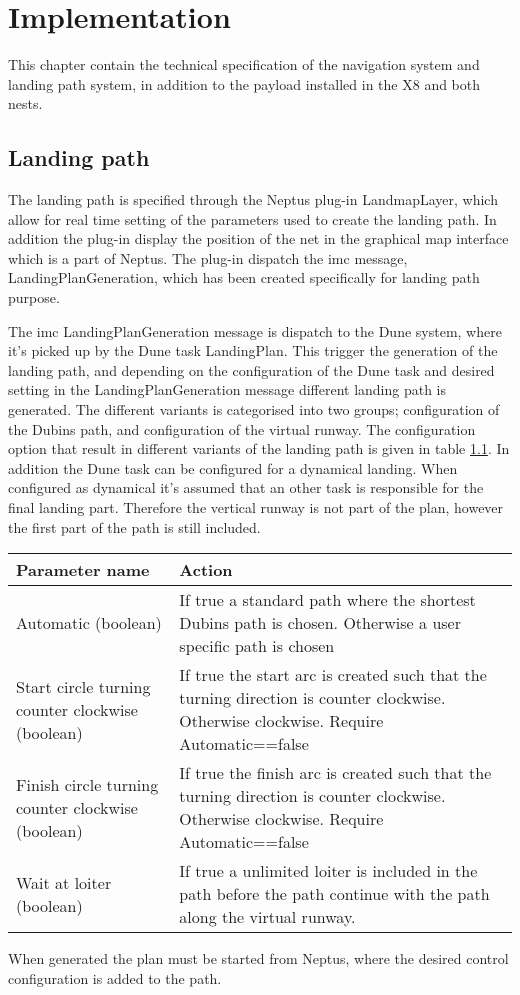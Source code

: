 \chapter{Implementation}
This chapter contain the technical specification of the navigation system and landing path system, in addition to the payload installed in the X8 and both nests.
\section{Landing path}
The landing path is specified through the Neptus plug-in LandmapLayer, which allow for real time setting of the parameters used to create the landing path. In addition the plug-in display the position of the net in the graphical map interface which is a part of Neptus. The plug-in dispatch the \gls{imc} message, LandingPlanGeneration, which has been created specifically for landing path purpose.

The \gls{imc} LandingPlanGeneration message is dispatch to the Dune system, where it's picked up by the Dune task LandingPlan. This trigger the generation of the landing path, and depending on the configuration of the Dune task and desired setting in the LandingPlanGeneration message different landing path is generated. The different variants is categorised into two groups; configuration of the Dubins path, and configuration of the virtual runway. The configuration option that result in different variants of the landing path is given in table \ref{Tb:DubinConfig}. In addition the Dune task can be configured for a dynamical landing. When configured as dynamical it's assumed that an other task is responsible for the final landing part. Therefore the vertical runway is not part of the plan, however the first part of the path is still included.
\begin{table}
\centering
\begin{tabular}{| p{2.7cm} | | p{6cm} |}
\hline
\textbf{Parameter name} 							& \textbf{Action} \\ \hline
 Automatic (boolean)								& If true a standard path where the shortest Dubins path is chosen. Otherwise a user specific path is chosen \\ \hline
Start circle turning counter clockwise (boolean)	& If true the start arc is created such that the turning direction is counter clockwise. Otherwise clockwise. Require Automatic==false \\ \hline
Finish circle turning counter clockwise (boolean)	& If true the finish arc is created such that the turning direction is counter clockwise. Otherwise clockwise. Require Automatic==false \\ \hline
Wait at loiter (boolean)							& If true a unlimited loiter is included in the path before the path continue with the path along the virtual runway. \\ \hline

\end{tabular}
\label{Tb:DubinConfig}
\end{table}
When generated the plan must be started from Neptus, where the desired control configuration is added to the path.

